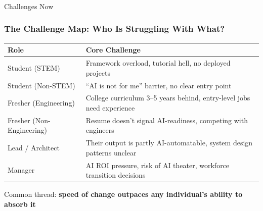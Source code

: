 \begin{frame}[fragile]\frametitle{}

	\begin{center}
	{\Large Challenges Now}
	\end{center}

\end{frame}


\begin{frame}[fragile]\frametitle{The Challenge Map: Who Is Struggling With What?}

\begin{center}
\begin{tabular}{|l|p{7cm}|}
\hline
\textbf{Role} & \textbf{Core Challenge} \\
\hline
Student (STEM) & Framework overload, tutorial hell, no deployed projects \\
\hline
Student (Non-STEM) & ``AI is not for me'' barrier, no clear entry point \\
\hline
Fresher (Engineering) & College curriculum 3--5 years behind, entry-level jobs need experience \\
\hline
Fresher (Non-Engineering) & Resume doesn't signal AI-readiness, competing with engineers \\
\hline
Lead / Architect & Their output is partly AI-automatable, system design patterns unclear \\
\hline
Manager & AI ROI pressure, risk of AI theater, workforce transition decisions \\
\hline
\end{tabular}
\end{center}

\vspace{0.2cm}
{\small Common thread: \textbf{speed of change outpaces any individual's ability to absorb it}}

\end{frame}


